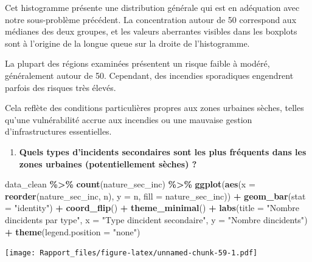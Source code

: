 \documentclass[
]{article}
\newenvironment{Shaded}{\begin{snugshade}}{\end{snugshade}}
\newcommand{\AttributeTok}[1]{\textcolor[rgb]{0.13,0.29,0.53}{#1}}
\newcommand{\FunctionTok}[1]{\textcolor[rgb]{0.13,0.29,0.53}{\textbf{#1}}}
\newcommand{\NormalTok}[1]{#1}
\newcommand{\SpecialCharTok}[1]{\textcolor[rgb]{0.81,0.36,0.00}{\textbf{#1}}}
\newcommand{\StringTok}[1]{\textcolor[rgb]{0.31,0.60,0.02}{#1}}
\providecommand{\tightlist}{%
  \setlength{\itemsep}{0pt}\setlength{\parskip}{0pt}}
\begin{document}
Cet histogramme présente une distribution générale qui est en adéquation
avec notre sous-problème précédent. La concentration autour de 50
correspond aux médianes des deux groupes, et les valeurs aberrantes
visibles dans les boxplots sont à l'origine de la longue queue sur la
droite de l'histogramme.

La plupart des régions examinées présentent un risque faible à modéré,
généralement autour de 50. Cependant, des incendies sporadiques
engendrent parfois des risques très élevés.

Cela reflète des conditions particulières propres aux zones urbaines
sèches, telles qu'une vulnérabilité accrue aux incendies ou une mauvaise
gestion d'infrastructures essentielles.

\begin{enumerate}
\def\labelenumi{\arabic{enumi}.}
\setcounter{enumi}{2}
\tightlist
\item
  \textbf{Quels types d'incidents secondaires sont les plus fréquents
  dans les zones urbaines (potentiellement sèches) ?}
\end{enumerate}

\begin{Shaded}
\begin{Highlighting}[]
\NormalTok{data\_clean }\SpecialCharTok{\%\textgreater{}\%}
  \FunctionTok{count}\NormalTok{(nature\_sec\_inc) }\SpecialCharTok{\%\textgreater{}\%}
  \FunctionTok{ggplot}\NormalTok{(}\FunctionTok{aes}\NormalTok{(}\AttributeTok{x =} \FunctionTok{reorder}\NormalTok{(nature\_sec\_inc, n), }\AttributeTok{y =}\NormalTok{ n, }\AttributeTok{fill =}\NormalTok{ nature\_sec\_inc)) }\SpecialCharTok{+}
  \FunctionTok{geom\_bar}\NormalTok{(}\AttributeTok{stat =} \StringTok{"identity"}\NormalTok{) }\SpecialCharTok{+}
  \FunctionTok{coord\_flip}\NormalTok{() }\SpecialCharTok{+}
  \FunctionTok{theme\_minimal}\NormalTok{() }\SpecialCharTok{+}
  \FunctionTok{labs}\NormalTok{(}\AttributeTok{title =} \StringTok{"Nombre d\textquotesingle{}incidents par type"}\NormalTok{,}
       \AttributeTok{x =} \StringTok{"Type d\textquotesingle{}incident secondaire"}\NormalTok{,}
       \AttributeTok{y =} \StringTok{"Nombre d\textquotesingle{}incidents"}\NormalTok{) }\SpecialCharTok{+}
  \FunctionTok{theme}\NormalTok{(}\AttributeTok{legend.position =} \StringTok{"none"}\NormalTok{)}
\end{Highlighting}
\end{Shaded}

\texttt{[image: Rapport\_files/figure-latex/unnamed-chunk-59-1.pdf]}
\end{document}

